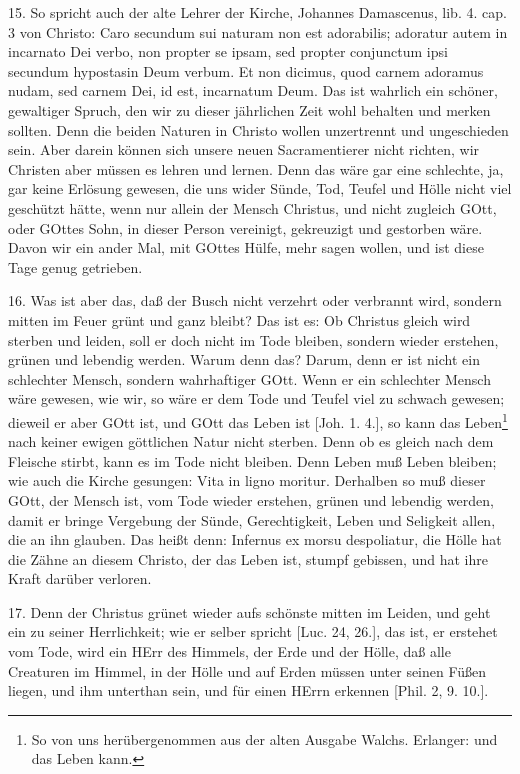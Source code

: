 15. So spricht auch der alte Lehrer der Kirche, Johannes Damascenus, lib. 4. cap. 3 von Christo: Caro secundum sui naturam non est adorabilis; adoratur autem in incarnato Dei verbo, non propter se ipsam, sed propter conjunctum ipsi secundum hypostasin Deum verbum. Et non dicimus, quod carnem adoramus nudam, sed carnem Dei, id est, incarnatum Deum. Das ist wahrlich ein schöner, gewaltiger Spruch, den wir zu dieser jährlichen Zeit wohl behalten und merken sollten. Denn die beiden Naturen in Christo wollen unzertrennt und ungeschieden sein. Aber darein können sich unsere neuen Sacramentierer nicht richten, wir Christen aber müssen es lehren und lernen. Denn das wäre gar eine schlechte, ja, gar keine Erlösung gewesen, die uns wider Sünde, Tod, Teufel und Hölle nicht viel geschützt hätte, wenn nur allein der Mensch Christus, und nicht zugleich GOtt, oder GOttes Sohn, in dieser Person vereinigt, gekreuzigt und gestorben wäre. Davon wir ein ander Mal, mit GOttes Hülfe, mehr sagen wollen, und ist diese Tage genug getrieben.

16. Was ist aber das, daß der Busch nicht verzehrt oder verbrannt wird, sondern mitten im Feuer grünt und ganz bleibt? Das ist es: Ob Christus gleich wird sterben und leiden, soll er doch nicht im Tode bleiben, sondern wieder erstehen, grünen und lebendig werden. Warum denn das? Darum, denn er ist nicht ein schlechter Mensch, sondern wahrhaftiger GOtt. Wenn er ein schlechter Mensch wäre gewesen, wie wir, so wäre er dem Tode und Teufel viel zu schwach gewesen; dieweil er aber GOtt ist, und GOtt das Leben ist [Joh. 1. 4.], so kann das Leben\footnote{So von uns herübergenommen aus der alten Ausgabe Walchs. Erlanger: und das Leben kann.} nach keiner ewigen göttlichen Natur nicht sterben. Denn ob es gleich nach dem Fleische stirbt, kann es im Tode nicht bleiben. Denn Leben muß Leben bleiben; wie auch die Kirche gesungen: Vita in ligno moritur. Derhalben so muß dieser GOtt, der Mensch ist, vom Tode wieder erstehen, grünen und lebendig werden, damit er bringe Vergebung der Sünde, Gerechtigkeit, Leben und Seligkeit allen, die an ihn glauben. Das heißt denn: Infernus ex morsu despoliatur, die Hölle hat die Zähne an diesem Christo, der das Leben ist, stumpf gebissen, und hat ihre Kraft darüber verloren.

17. Denn der Christus grünet wieder aufs schönste mitten im Leiden, und geht ein zu seiner Herrlichkeit; wie er selber spricht [Luc. 24, 26.], das ist, er erstehet vom Tode, wird ein HErr des Himmels, der Erde und der Hölle, daß alle Creaturen im Himmel, in der Hölle und auf Erden müssen unter seinen Füßen liegen, und ihm unterthan sein, und für einen HErrn erkennen [Phil. 2, 9. 10.].

